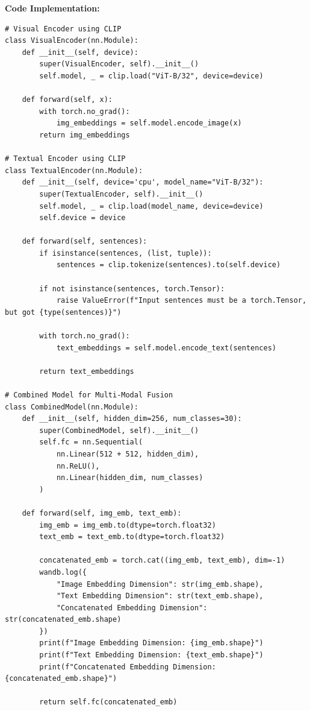 \documentclass[11pt, oneside]{article}   	%
\begin{document}
\textbf{Code Implementation: } 
\\
\begin{verbatim}
# Visual Encoder using CLIP
class VisualEncoder(nn.Module):
    def __init__(self, device):
        super(VisualEncoder, self).__init__()
        self.model, _ = clip.load("ViT-B/32", device=device)

    def forward(self, x):
        with torch.no_grad():
            img_embeddings = self.model.encode_image(x)
        return img_embeddings

# Textual Encoder using CLIP
class TextualEncoder(nn.Module):
    def __init__(self, device='cpu', model_name="ViT-B/32"):
        super(TextualEncoder, self).__init__()
        self.model, _ = clip.load(model_name, device=device)
        self.device = device

    def forward(self, sentences):
        if isinstance(sentences, (list, tuple)):
            sentences = clip.tokenize(sentences).to(self.device)

        if not isinstance(sentences, torch.Tensor):
            raise ValueError(f"Input sentences must be a torch.Tensor, but got {type(sentences)}")

        with torch.no_grad():
            text_embeddings = self.model.encode_text(sentences)

        return text_embeddings

# Combined Model for Multi-Modal Fusion
class CombinedModel(nn.Module):
    def __init__(self, hidden_dim=256, num_classes=30):
        super(CombinedModel, self).__init__()
        self.fc = nn.Sequential(
            nn.Linear(512 + 512, hidden_dim),
            nn.ReLU(),
            nn.Linear(hidden_dim, num_classes)
        )

    def forward(self, img_emb, text_emb):
        img_emb = img_emb.to(dtype=torch.float32)
        text_emb = text_emb.to(dtype=torch.float32)

        concatenated_emb = torch.cat((img_emb, text_emb), dim=-1)
        wandb.log({
            "Image Embedding Dimension": str(img_emb.shape),
            "Text Embedding Dimension": str(text_emb.shape),
            "Concatenated Embedding Dimension": str(concatenated_emb.shape)
        })
        print(f"Image Embedding Dimension: {img_emb.shape}")
        print(f"Text Embedding Dimension: {text_emb.shape}")
        print(f"Concatenated Embedding Dimension: {concatenated_emb.shape}")

        return self.fc(concatenated_emb)
\end{verbatim}
\end{document}
